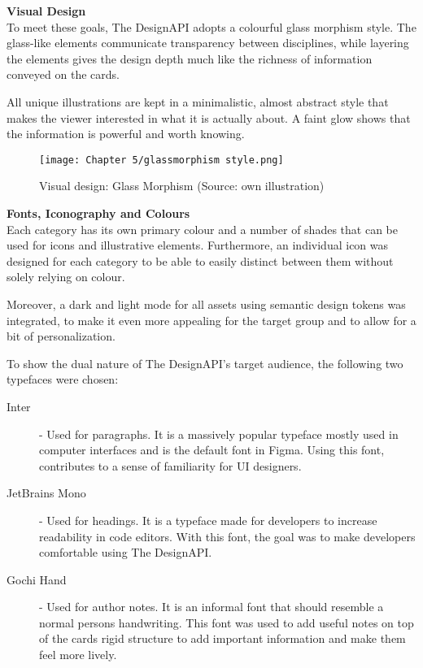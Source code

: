 \textbf{Visual Design}\\
To meet these goals, The DesignAPI adopts a colourful glass morphism style. The glass-like elements
communicate transparency between disciplines, while layering the elements gives the design depth
much like the richness of information conveyed on the cards.

All unique illustrations are kept in a minimalistic, almost abstract style that makes the viewer
interested in what it is actually about. A faint glow shows that the information is powerful and
worth knowing.

\begin{figure}[H]
      \centering
      \texttt{[image: Chapter 5/glassmorphism style.png]}
      \caption{Visual design: Glass Morphism (Source: own illustration)}
\end{figure}

\textbf{Fonts, Iconography and Colours}\\
Each category has its own primary colour and a number of shades that can be used for icons and
illustrative elements. Furthermore, an individual icon was designed for each category to be able to
easily distinct between them without solely relying on colour.

Moreover, a dark and light mode for all assets using semantic design tokens was integrated, to
make it even more appealing for the target group and to allow for a bit of personalization.

To show the dual nature of The DesignAPI's target audience, the following two typefaces were chosen:
\begin{description}
      \item[Inter] - Used for paragraphs. It is a massively popular typeface mostly used in
            computer interfaces and is the default font in Figma. Using this font, contributes to a
            sense of familiarity for UI designers. 

      \item[JetBrains Mono] - Used for headings. It is a typeface made for developers to increase
            readability in code editors. With this font, the goal was to make developers comfortable
            using The DesignAPI. 

      \item[Gochi Hand] - Used for author notes. It is an informal font that should resemble a normal
            persons handwriting. This font was used to add useful notes on top of the cards rigid structure
            to add important information and make them feel more lively. 
\end{description}

